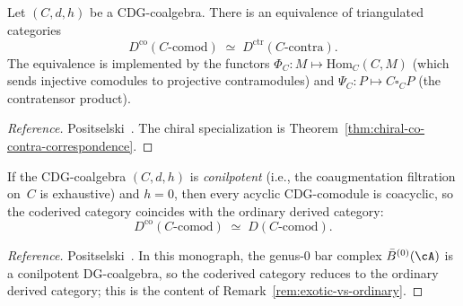 \begin{theorem}
\label{thm:co-contra-correspondence-appendix}
Let $(C, d, h)$ be a CDG-coalgebra. There is an equivalence of
triangulated categories
\begin{equation}\label{eq:co-contra-equivalence}
D^{\mathrm{co}}(C\text{-}\mathrm{comod})
\;\simeq\;
D^{\mathrm{ctr}}(C\text{-}\mathrm{contra}).
\end{equation}
The equivalence is implemented by the functors
$\Phi_C \colon M \mapsto \mathrm{Hom}_C(C, M)$ \textup{(}which
sends injective comodules to projective contramodules\textup{)}
and $\Psi_C \colon P \mapsto C \square_C P$ \textup{(}the
contratensor product\textup{)}.
\end{theorem}

\begin{proof}[Reference]
Positselski~\cite[Theorem~5.2]{Positselski11}. The chiral
specialization is Theorem~\ref{thm:chiral-co-contra-correspondence}.
\end{proof}

\begin{theorem}
\label{thm:conilpotent-reduction}
If the CDG-coalgebra $(C, d, h)$ is \emph{conilpotent}
\textup{(}i.e., the coaugmentation filtration on~$C$ is
exhaustive\textup{)} and $h = 0$, then every acyclic
CDG-comodule is coacyclic, so the coderived category coincides
with the ordinary derived category:
\begin{equation}\label{eq:conilpotent-reduction}
D^{\mathrm{co}}(C\text{-}\mathrm{comod})
\;\simeq\;
D(C\text{-}\mathrm{comod}).
\end{equation}
\end{theorem}

\begin{proof}[Reference]
Positselski~\cite[Corollary~4.4]{Positselski11}. In this
monograph, the genus-$0$ bar complex
$\bar{B}^{(0)}(\cA)$ is a conilpotent DG-coalgebra, so
the coderived category reduces to the ordinary derived
category; this is the content of
Remark~\textup{\ref{rem:exotic-vs-ordinary}}.
\end{proof}


